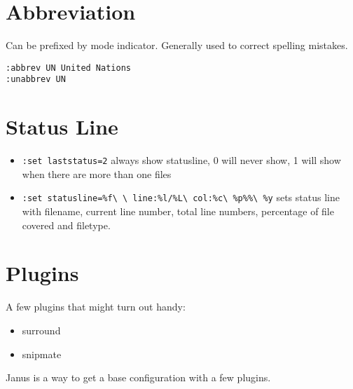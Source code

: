 \documentclass[a4paper, 12pt]{article}
\begin{document}
\section{Abbreviation}
Can be prefixed by mode indicator. Generally used to correct spelling mistakes.
\begin{verbatim}
:abbrev UN United Nations
:unabbrev UN
\end{verbatim}

\section{Status Line}
\begin{itemize}
	\item \verb|:set laststatus=2| always show statusline, 0 will never show, 1 will show when there are more than one files	
	\item \verb|:set statusline=%f\ \ line:%l/%L\ col:%c\ %p%%\ %y| sets status line with filename, current line number, total line numbers, percentage of file covered and filetype.
\end{itemize}

\section{Plugins}
A few plugins that might turn out handy:
\begin{itemize}
	\item surround	
	\item snipmate
\end{itemize}
Janus is a way to get a base configuration with a few plugins.
\end{document}
